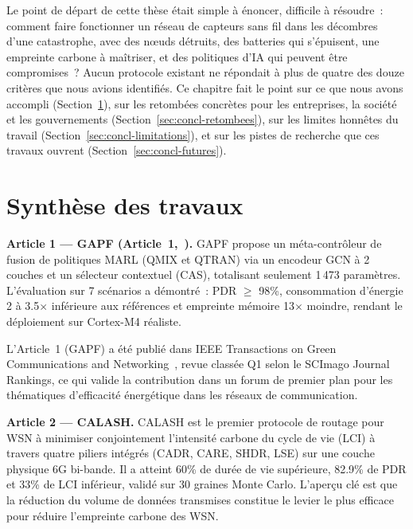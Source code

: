 \label{sec:Conclusion}

Le point de départ de cette thèse était simple à énoncer, difficile à résoudre~: comment faire fonctionner un réseau de capteurs sans fil dans les décombres d'une catastrophe, avec des nœuds détruits, des batteries qui s'épuisent, une empreinte carbone à maîtriser, et des politiques d'IA qui peuvent être compromises~? Aucun protocole existant ne répondait à plus de quatre des douze critères que nous avions identifiés. Ce chapitre fait le point sur ce que nous avons accompli (Section~\ref{sec:concl-synthese}), sur les retombées concrètes pour les entreprises, la société et les gouvernements (Section~\ref{sec:concl-retombees}), sur les limites honnêtes du travail (Section~\ref{sec:concl-limitations}), et sur les pistes de recherche que ces travaux ouvrent (Section~\ref{sec:concl-futures}).

\section{Synthèse des travaux}\label{sec:concl-synthese}

\textbf{Article 1 --- GAPF (Article~1,~\cite{gapf_tgcn2026}).}
GAPF propose un méta-contrôleur de fusion de politiques MARL (QMIX et QTRAN) via un encodeur GCN à 2 couches et un sélecteur contextuel (CAS), totalisant seulement 1\,473 paramètres. L'évaluation sur 7 scénarios a démontré~: PDR $\geq$ 98\%, consommation d'énergie 2 à 3.5$\times$ inférieure aux références et empreinte mémoire 13$\times$ moindre, rendant le déploiement sur Cortex-M4 réaliste.

L'Article~1 (GAPF) a été publié dans IEEE Transactions on Green Communications and Networking~\cite{gapf_tgcn2026}, revue classée Q1 selon le SCImago Journal Rankings, ce qui valide la contribution dans un forum de premier plan pour les thématiques d'efficacité énergétique dans les réseaux de communication.

\textbf{Article 2 --- CALASH.}
CALASH est le premier protocole de routage pour WSN à minimiser conjointement l'intensité carbone du cycle de vie (LCI) à travers quatre piliers intégrés (CADR, CARE, SHDR, LSE) sur une couche physique 6G bi-bande. Il a atteint 60\% de durée de vie supérieure, 82.9\% de PDR et 33\% de LCI inférieur, validé sur 30 graines Monte Carlo. L'aperçu clé est que la réduction du volume de données transmises constitue le levier le plus efficace pour réduire l'empreinte carbone des WSN.

